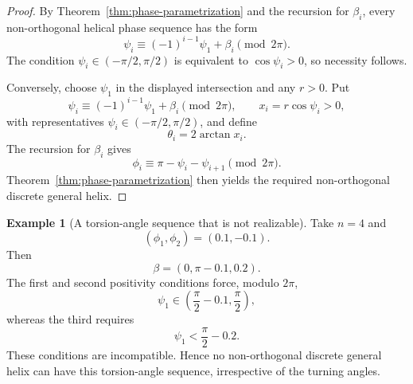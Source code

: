 \documentclass[10pt,a4paper]{amsart}
\theoremstyle{definition}
\newtheorem{example}[theorem]{Example}
\theoremstyle{remark}
\numberwithin{equation}{section}
\begin{document}
\begin{proof}
By Theorem~\ref{thm:phase-parametrization} and the recursion for $\beta_i$, every non-orthogonal helical phase sequence has the form
\[
\psi_i\equiv(-1)^{i-1}\psi_1+\beta_i\pmod{2\pi}.
\]
The condition $\psi_i\in(-\pi/2,\pi/2)$ is equivalent to $\cos\psi_i>0$, so necessity follows.

Conversely, choose $\psi_1$ in the displayed intersection and any $r>0$. Put
\[
\psi_i\equiv(-1)^{i-1}\psi_1+\beta_i\pmod{2\pi},
\qquad
x_i=r\cos\psi_i>0,
\]
with representatives $\psi_i\in(-\pi/2,\pi/2)$, and define
\[
\theta_i=2\arctan x_i.
\]
The recursion for $\beta_i$ gives
\[
\phi_i\equiv\pi-\psi_i-\psi_{i+1}\pmod{2\pi}.
\]
Theorem~\ref{thm:phase-parametrization} then yields the required non-orthogonal discrete general helix.
\end{proof}

\begin{example}[A torsion-angle sequence that is not realizable]\label{ex:torsion-nonrealizable}
Take $n=4$ and
\[
(\phi_1,\phi_2)=(0.1,-0.1).
\]
Then
\[
\beta=(0,\pi-0.1,0.2).
\]
The first and second positivity conditions force, modulo $2\pi$,
\[
\psi_1\in\left(\frac\pi2-0.1,\frac\pi2\right),
\]
whereas the third requires
\[
\psi_1<\frac\pi2-0.2.
\]
These conditions are incompatible. Hence no non-orthogonal discrete general helix can have this torsion-angle sequence, irrespective of the turning angles.
\end{example}
\end{document}
